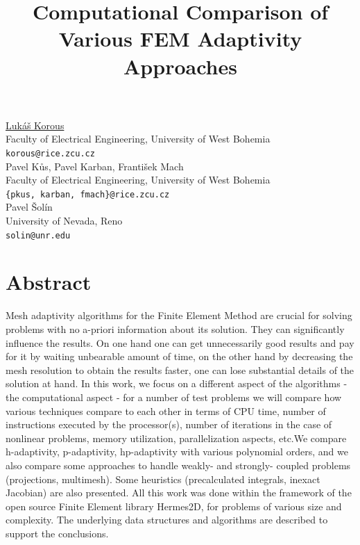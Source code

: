 \documentclass[article, A4, 11pt]{llncs}%
\begin{document}
\title{Computational Comparison of Various FEM Adaptivity Approaches}
 \author{} \institute{}
\maketitle
\begin{center}
{\large \underline{Lukáš Korous}}\\
Faculty of Electrical Engineering, University of West Bohemia\\
{\tt korous@rice.zcu.cz}
\\ \vspace{4mm}
{\large Pavel Kůs, Pavel Karban, František Mach}\\
Faculty of Electrical Engineering, University of West Bohemia\\
{\tt \{pkus, karban, fmach\}@rice.zcu.cz}
\\ \vspace{4mm}
{\large Pavel Šolín}\\
University of Nevada, Reno\\
{\tt solin@unr.edu}
\end{center}

\section*{Abstract}
Mesh adaptivity algorithms for the Finite Element Method are crucial for solving problems with no  a-priori information about its solution. They can significantly influence the results. On one hand one can get unnecessarily good results and pay for it by waiting unbearable amount of time, on the other hand by decreasing the mesh resolution to obtain the results faster, one can lose substantial details of the solution at hand. In this work, we focus on a different aspect of the algorithms - the computational aspect - for a number of test problems we will compare how various techniques compare to each other in terms of CPU time, number of instructions executed by the processor(s), number of iterations in the case of nonlinear problems, memory utilization, parallelization aspects, etc.We compare h-adaptivity, p-adaptivity, hp-adaptivity with various polynomial orders, and we also compare some approaches to handle weakly- and strongly- coupled problems (projections, multimesh). Some heuristics (precalculated integrals, inexact Jacobian) are also presented. All this work was done within the framework of the open source Finite Element library Hermes2D, for problems of various size and complexity. The underlying data structures and algorithms are described to support the conclusions.
\end{document}
